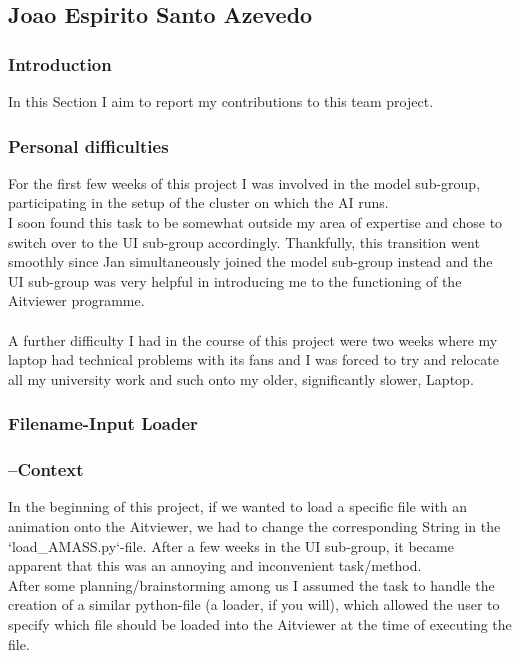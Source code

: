 \documentclass[a4paper]{scrartcl}
\begin{document}
\subsection*{Joao Espirito Santo Azevedo}
\subsubsection*{Introduction}
In this Section I aim to report my contributions to this team project.\\

\subsubsection*{Personal difficulties}
For the first few weeks of this project I was involved in the model sub-group, participating in the setup of the cluster on which the AI runs.\\

I soon found this task to be somewhat outside my area of expertise and chose to switch over to the UI sub-group accordingly. Thankfully, this transition went smoothly since Jan simultaneously joined the model sub-group instead and the UI sub-group was very helpful in introducing me to the functioning of the Aitviewer programme.\\
\\
A further difficulty I had in the course of this project were two weeks where my laptop had technical problems with its fans and I was forced to try and relocate all my university work and such onto my older, significantly slower, Laptop.

\subsubsection*{Filename-Input Loader}
\subsubsection*{--Context}
In the beginning of this project, if we wanted to load a specific file with an animation onto the Aitviewer, we had to change the corresponding String in the `load\_AMASS.py`-file. After a few weeks in the UI sub-group, it became apparent that this was an annoying and inconvenient task/method.
\\
After some planning/brainstorming among us I assumed the task to handle the creation of a similar python-file (a loader, if you will), which allowed the user to specify which file should be loaded into the Aitviewer at the time of executing the file.
\end{document}
